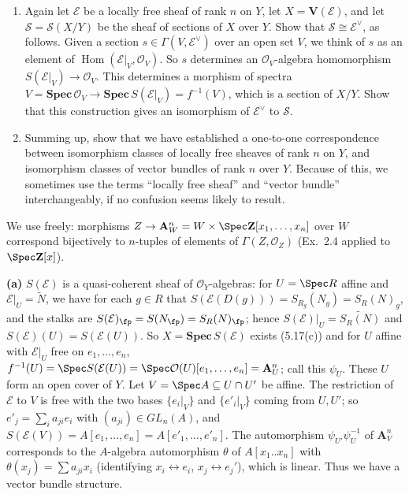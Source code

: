 \documentclass[11pt]{article}
\begin{document}
{\begin{enumerate}[label=(\alph*),leftmargin=*]
\item Again let $\mathcal E$ be a locally free sheaf of rank $n$ on $Y$, let $X=\mathbf V(\mathcal E)$, and let $\mathcal S=\mathcal S(X/Y)$ be the sheaf of sections of $X$ over $Y$. Show that $\mathcal S\cong\mathcal E^\vee$, as follows. Given a section $s\in\Gamma(V,\mathcal E^\vee)$ over an open set $V$, we think of $s$ as an element of $\operatorname{Hom}(\mathcal E|_V,\mathcal O_V)$. So $s$ determines an $\mathcal O_V$-algebra homomorphism $S(\mathcal E|_V)\to\mathcal O_V$. This determines a morphism of spectra $V=\mathbf{Spec}\,\mathcal O_V\to\mathbf{Spec}\,S(\mathcal E|_V)=f^{-1}(V)$, which is a section of $X/Y$. Show that this construction gives an isomorphism of $\mathcal E^\vee$ to $\mathcal S$.
\item Summing up, show that we have established a one-to-one correspondence between isomorphism classes of locally free sheaves of rank $n$ on $Y$, and isomorphism classes of vector bundles of rank $n$ over $Y$. Because of this, we sometimes use the terms ``locally free sheaf'' and ``vector bundle'' interchangeably, if no confusion seems likely to result.
\end{enumerate}}
\pf
We use freely: morphisms $Z\to\mathbf A^n_W=W\times\Spec\mathbf Z[x_1,\dots,x_n]$ over $W$ correspond bijectively to $n$-tuples of elements of $\Gamma(Z,\mathcal O_Z)$ (Ex.\ 2.4 applied to $\Spec\mathbf Z[x]$).

\textbf{(a)} $S(\mathcal E)$ is a quasi-coherent sheaf of $\mathcal O_Y$-algebras: for $U=\Spec R$ affine and $\mathcal E|_U=\widetilde N$, we have for each $g\in R$ that $S(\mathcal E(D(g)))=S_{R_g}(N_g)=S_R(N)_g$, and the stalks are $S(\mathcal E)_\fp=S(N_\fp)=S_R(N)_\fp$; hence $S(\mathcal E)|_U=\widetilde{S_R(N)}$ and $S(\mathcal E)(U)=S(\mathcal E(U))$. So $X=\mathbf{Spec}\,S(\mathcal E)$ exists (5.17(c)) and for $U$ affine with $\mathcal E|_U$ free on $e_1,\dots,e_n$, $f^{-1}(U)=\Spec S(\mathcal E(U))=\Spec\mathcal O(U)[e_1,\dots,e_n]=\mathbf A^n_U$; call this $\psi_U$. These $U$ form an open cover of $Y$. Let $V=\Spec A\subseteq U\cap U'$ be affine. The restriction of $\mathcal E$ to $V$ is free with the two bases $\{e_i|_V\}$ and $\{e'_i|_V\}$ coming from $U,U'$; so $e'_j=\sum_ia_{ji}e_i$ with $(a_{ji})\in GL_n(A)$, and $S(\mathcal E(V))=A[e_1,\dots,e_n]=A[e'_1,\dots,e'_n]$. The automorphism $\psi_{U'}\psi_U^{-1}$ of $\mathbf A^n_V$ corresponds to the $A$-algebra automorphism $\theta$ of $A[x_1..x_n]$ with $\theta(x_j)=\sum a_{ji}x_i$ (identifying $x_i\leftrightarrow e_i$, $x_j\leftrightarrow e_j'$), which is linear. Thus we have a vector bundle structure.
\end{document}
